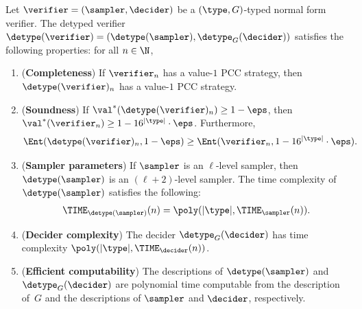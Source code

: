 \begin{lemma}
  \label{lem:detyping-verifiers}
  Let $\verifier = (\sampler,\decider)$ be a $(\type,G)$-typed normal form
  verifier.
  The detyped verifier $\detype(\verifier) =
  (\detype(\sampler),\detype_G(\decider))$ satisfies the following properties:
  for all $n \in \N$,
  \begin{enumerate}
	\item (\textbf{Completeness}) If $\verifier_n$ has a value-$1$ PCC strategy,
    then $\detype(\verifier)_n$ has a value-$1$ PCC strategy.
	\item (\textbf{Soundness}) If $\val^*(\detype(\verifier)_n) \geq 1 - \eps$,
    then $\val^*(\verifier_n) \geq 1 - 16^{|\type|} \cdot \eps$.
    Furthermore,
    \[
      \Ent(\detype(\verifier)_n,1 - \eps) \geq
      \Ent(\verifier_n,1 - 16^{|\type|} \cdot\eps).
    \]
	\item (\textbf{Sampler parameters}) If $\sampler$ is an $\ell$-level sampler,
    then $\detype(\sampler)$ is an $(\ell+2)$-level sampler.
    The time complexity of $\detype(\sampler)$ satisfies the
    following:
    \begin{gather*}
      \TIME_{\detype(\sampler)}(n) = \poly(|\type|,\TIME_\sampler(n)).
    \end{gather*}
	\item (\textbf{Decider complexity}) The decider $\detype_G(\decider)$ has time
    complexity $\poly(|\type|,\TIME_\decider(n))$.
	\item (\textbf{Efficient computability}) The descriptions of
    $\detype(\sampler)$ and $\detype_G(\decider)$ are polynomial time
    computable from the description of~$G$ and the descriptions of $\sampler$
    and $\decider$, respectively.
  \end{enumerate}
\end{lemma}

